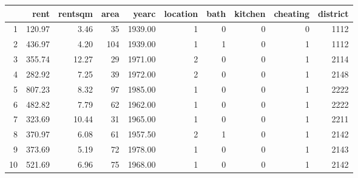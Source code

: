 \documentclass{article}
\begin{document}


\begin{table}[ht]
\centering
\begin{tabular}{rrrrrrrrrr}
  \hline
 & rent & rentsqm & area & yearc & location & bath & kitchen & cheating & district \\ 
  \hline
1 & 120.97 & 3.46 &  35 & 1939.00 &   1 &   0 &   0 &   0 & 1112 \\ 
  2 & 436.97 & 4.20 & 104 & 1939.00 &   1 &   1 &   0 &   1 & 1112 \\ 
  3 & 355.74 & 12.27 &  29 & 1971.00 &   2 &   0 &   0 &   1 & 2114 \\ 
  4 & 282.92 & 7.25 &  39 & 1972.00 &   2 &   0 &   0 &   1 & 2148 \\ 
  5 & 807.23 & 8.32 &  97 & 1985.00 &   1 &   0 &   0 &   1 & 2222 \\ 
  6 & 482.82 & 7.79 &  62 & 1962.00 &   1 &   0 &   0 &   1 & 2222 \\ 
  7 & 323.69 & 10.44 &  31 & 1965.00 &   1 &   0 &   0 &   1 & 2211 \\ 
  8 & 370.97 & 6.08 &  61 & 1957.50 &   2 &   1 &   0 &   1 & 2142 \\ 
  9 & 373.69 & 5.19 &  72 & 1978.00 &   1 &   0 &   0 &   1 & 2143 \\ 
  10 & 521.69 & 6.96 &  75 & 1968.00 &   1 &   0 &   0 &   1 & 2142 \\ 
   \hline
\end{tabular}
\end{table}
\end{document}

